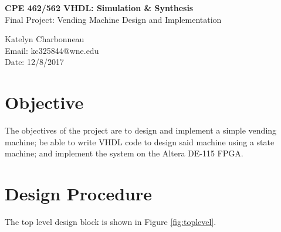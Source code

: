\documentclass[12pt]{article}
\begin{document}
\begin{figure}[htb]
\hfil \hspace{.5in}
\end{figure}

\begin{center}
{\Large {\bf CPE 462/562 VHDL: Simulation \& Synthesis}}\\
\vspace{0.2in}
{\Large{Final Project: Vending Machine Design and Implementation}} \\
\vspace{0.2in}

Katelyn Charbonneau\\
Email: kc325844@wne.edu\\
Date: 12/8/2017\\
\end{center}


\newpage

\section{Objective} \label{sec:obj}
The objectives of the project are to design and implement a simple vending machine; be able to write VHDL code to design said machine using a state machine; and implement the system on the Altera DE-115 FPGA.

\section{Design Procedure} \label{sec:desproc}
The top level design block is shown in Figure \ref{fig:toplevel}.

\end{document}
